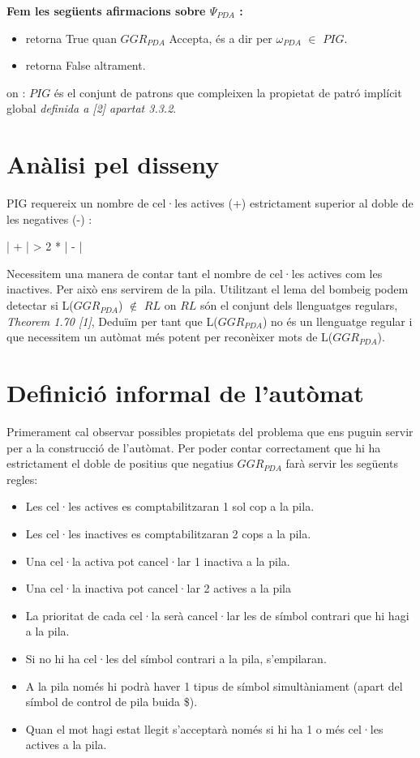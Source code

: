 \documentclass[12pt,a4paper]{report}
\def \wpda{$\omega_{PDA} $}
\def \pda{$GGR_{PDA} $}
\def \postPDA{$\Psi_{PDA}$}
\begin{document}
\textbf{Fem les següents afirmacions sobre \postPDA{} :}
\begin{itemize}
\item retorna True quan \pda{} Accepta, és a dir per \wpda{} $\in$ $PIG$.
\item retorna False altrament.
\end{itemize}
on : $PIG$ és el conjunt de patrons que compleixen la propietat de patró implícit global \textit{definida a [2] apartat 3.3.2}.

\section{Anàlisi pel disseny}

PIG requereix un nombre de cel·les actives (+) estrictament superior al doble de les negatives (-) :

\begin{center}
| + | > 2 * | - |
\end{center}

Necessitem una manera de contar tant el nombre de cel·les actives com les inactives. Per això ens servirem de la pila. Utilitzant el lema del bombeig podem detectar si L(\pda{}) $\not\in$ $RL$ on $RL$ són el conjunt dels llenguatges regulars, \textit{Theorem 1.70 [1]}, Deduïm per tant que L(\pda) no és un llenguatge regular i que necessitem un autòmat més potent per reconèixer mots de L(\pda).

\section{Definició informal de l’autòmat}

Primerament cal observar possibles propietats del problema que ens puguin servir per a la construcció de l’autòmat. Per poder contar correctament que hi ha estrictament el doble de positius que negatius \pda{} farà servir les següents regles:

\begin{itemize}
\item Les cel·les actives es comptabilitzaran 1 sol cop a la pila.
\item Les cel·les inactives es comptabilitzaran 2 cops a la pila.
\item Una cel·la activa pot cancel·lar 1 inactiva a la pila.
\item Una cel·la inactiva pot cancel·lar 2 actives a la pila
\item La prioritat de cada cel·la serà cancel·lar les de símbol contrari que hi hagi a la pila.
\item Si no hi ha cel·les del símbol contrari a la pila, s’empilaran.
\item A la pila només hi podrà haver 1 tipus de símbol simultàniament (apart del símbol de control de pila buida \$).
\item Quan el mot hagi estat llegit s’acceptarà només si hi ha 1 o més cel·les actives a la pila.
\end{itemize}
\end{document}
